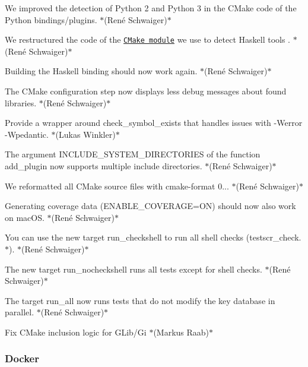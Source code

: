 \begin{DoxyItemize}
\item We improved the detection of Python 2 and Python 3 in the C\+Make code of the Python bindings/plugins. $\ast$(René Schwaiger)$\ast$
\item We restructured the code of the \href{https://master.libelektra.org/cmake/Modules/FindHaskell.cmake}{\tt C\+Make module} we use to detect Haskell tools . $\ast$(René Schwaiger)$\ast$
\item Building the Haskell binding should now work again. $\ast$(René Schwaiger)$\ast$
\item The C\+Make configuration step now displays less debug messages about found libraries. $\ast$(René Schwaiger)$\ast$
\item Provide a wrapper around {\ttfamily check\+\_\+symbol\+\_\+exists} that handles issues with {\ttfamily -\/\+Werror -\/\+Wpedantic}. $\ast$(Lukas Winkler)$\ast$
\item The argument {\ttfamily I\+N\+C\+L\+U\+D\+E\+\_\+\+S\+Y\+S\+T\+E\+M\+\_\+\+D\+I\+R\+E\+C\+T\+O\+R\+I\+ES} of the function {\ttfamily add\+\_\+plugin} now supports multiple include directories. $\ast$(René Schwaiger)$\ast$
\item We reformatted all C\+Make source files with cmake-\/format 0... $\ast$(René Schwaiger)$\ast$
\item Generating coverage data ({\ttfamily E\+N\+A\+B\+L\+E\+\_\+\+C\+O\+V\+E\+R\+A\+GE=ON}) should now also work on mac\+OS. $\ast$(René Schwaiger)$\ast$
\item You can use the new target {\ttfamily run\+\_\+checkshell} to run all shell checks ({\ttfamily testscr\+\_\+check.$\ast$}). $\ast$(René Schwaiger)$\ast$
\item The new target {\ttfamily run\+\_\+nocheckshell} runs all tests except for shell checks. $\ast$(René Schwaiger)$\ast$
\item The target {\ttfamily run\+\_\+all} now runs tests that do not modify the key database in parallel. $\ast$(René Schwaiger)$\ast$
\item Fix C\+Make inclusion logic for G\+Lib/\+Gi $\ast$(Markus Raab)$\ast$
\end{DoxyItemize}

\subsubsection*{Docker}


